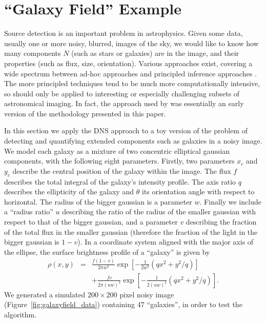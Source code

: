 \documentclass[letterpaper, 11pt]{article}
\begin{document}
\section{``Galaxy Field'' Example}
Source detection is an important problem in astrophysics. Given some data,
usually one or more noisy, blurred, images of the sky, we would like to know
how many components $N$ (such as stars or galaxies) are in the image, and their
properties (such as flux, size, orientation). Various approaches exist,
covering a wide spectrum between ad-hoc approaches and principled inference
approaches
\citep[e.g.][]{irwin, sextractor, dolphot, 2003MNRAS.338..765H, starfield}.
The more principled techniques tend to be much more computationally
intensive, so should only be applied to interesting or
especially challenging subsets of astronomical imaging. In fact, the approach
used by \citet{starfield} was essentially an early version of the methodology
presented in this paper.

In this section we apply
the DNS approach to a toy version of the problem of detecting and quantifying
extended components such as galaxies in a noisy image.
We model each galaxy as a mixture of two concentric elliptical gaussian
components, with
the following eight parameters. Firstly, two
parameters $x_c$ and $y_c$ describe the central position of the galaxy within
the image. The flux $f$ describes the total integral of the galaxy's
intensity profile. The axis ratio $q$ describes the ellipticity of the galaxy
and $\theta$ its orientation angle with respect to horizontal. The radius of the
bigger gaussian is a parameter $w$.
Finally
we include a ``radius ratio'' $u$ describing the ratio of the radius of the
smaller gaussian with respect to that of the bigger gaussian, and a parameter
$v$ describing the fraction of the total flux in the smaller gaussian
(therefore the fraction of the light in the bigger gaussian is $1-v$).
In a coordinate system aligned with the major axis of the ellipse, the
surface brightness profile of a ``galaxy'' is given by
\begin{eqnarray}
\rho(x, y) &=&
\frac{f(1-v)}{2\pi w^2}\exp\left[-\frac{1}{2w^2}\left(qx^2 + y^2/q\right)\right]\\
&&+\frac{fv}{2\pi (uw)^2}\exp\left[-\frac{1}{2(uw)^2}\left(qx^2 + y^2/q\right)\right].
\end{eqnarray}
We generated a simulated $200 \times 200$ pixel noisy image
(Figure~\ref{fig:galaxyfield_data}) containing 47 ``galaxies'',
in order to test the algorithm.
\end{document}

